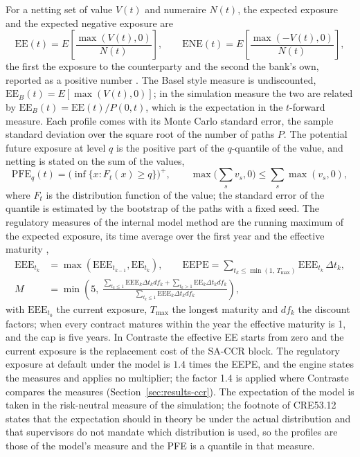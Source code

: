 For a netting set of value $V(t)$ and numeraire $N(t)$, the expected exposure and the expected negative exposure are
\begin{equation}
\mathrm{EE}(t)=E\!\left[\frac{\max(V(t),0)}{N(t)}\right],\qquad \mathrm{ENE}(t)=E\!\left[\frac{\max(-V(t),0)}{N(t)}\right],
\label{eq:ccr-ee}
\end{equation}
the first the exposure to the counterparty and the second the bank's own, reported as a positive number \citep{ccr:ore}. The Basel style measure is undiscounted, $\mathrm{EE}_B(t)=E[\max(V(t),0)]$; in the simulation measure the two
are related by $\mathrm{EE}_B(t)=\mathrm{EE}(t)/P(0,t)$, which is the expectation in the $t$-forward measure. Each profile comes with its Monte Carlo standard error, the sample standard deviation over the square root of the number of paths $P$. The potential future exposure at level
$q$ is the positive part of the $q$-quantile of the value, and netting is stated on the sum of the values,
\begin{equation}
\mathrm{PFE}_q(t)=\Big(\inf\{x:F_t(x)\ge q\}\Big)^{+},\qquad \max\Big(\sum_s v_s,0\Big)\le\sum_s\max(v_s,0),
\label{eq:ccr-pfe}
\end{equation}
where $F_t$ is the distribution function of the value; the standard error of the quantile is estimated by the bootstrap of the paths with a fixed seed. The regulatory measures of the internal model method are
the running maximum of the expected exposure, its time average over the first year and the effective maturity \citep{ccr:cre53},
\begin{equation}
\begin{aligned}
\mathrm{EEE}_{t_k}&=\max(\mathrm{EEE}_{t_{k-1}},\mathrm{EE}_{t_k}),\qquad
\mathrm{EEPE}=\sum_{t_k\le\min(1,\,T_{\max})}\mathrm{EEE}_{t_k}\,\Delta t_k,\\
M&=\min\!\left(5,\ \frac{\sum_{t_k\le1}\mathrm{EEE}_k\Delta t_kdf_k+\sum_{t_k>1}\mathrm{EE}_k\Delta t_kdf_k}{\sum_{t_k\le1}\mathrm{EEE}_k\Delta t_kdf_k}\right),
\end{aligned}
\label{eq:ccr-eff}
\end{equation}
with $\mathrm{EEE}_{t_0}$ the current exposure, $T_{\max}$ the longest maturity and $df_k$ the discount factors; when every contract matures within the year the effective maturity is 1, and the cap is five years. In Contraste the
effective EE starts from zero and the current exposure is the replacement cost of the SA-CCR block. The regulatory exposure at default under the model is $1.4$ times the EEPE, and the engine states the measures and
applies no multiplier; the factor 1.4 is applied where Contraste compares the measures (Section~\ref{sec:results-ccr}). The expectation of the model is taken in the risk-neutral measure of the simulation; the footnote of CRE53.12 states that the expectation should in theory be under
the actual distribution and that supervisors do not mandate which distribution is used, so the profiles are those of the model's measure and the PFE is a quantile in that measure.


